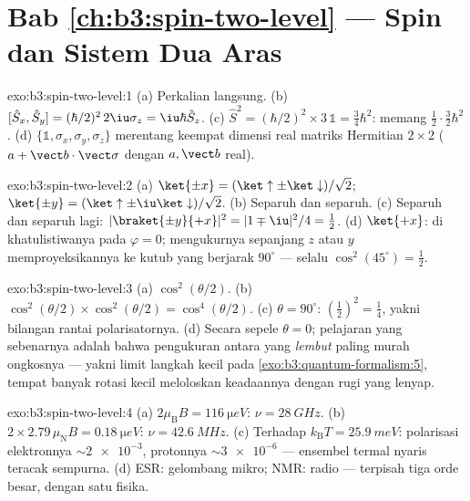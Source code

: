 \section*{Bab \ref{ch:b3:spin-two-level} --- Spin dan Sistem Dua Aras}

\begin{solution}{exo:b3:spin-two-level:1}
(a) Perkalian langsung. (b) $[\hat S_x, \hat S_y] =
(\hbar/2)^2\,2\iu\sigma_z = \iu\hbar\hat S_z$. (c) $\hat S^2 =
(\hbar/2)^2 \times 3\,\mathbb 1 = \tfrac34\hbar^2$: memang
$\tfrac12\cdot\tfrac32\hbar^2$. (d) $\{\mathbb 1, \sigma_x,
\sigma_y, \sigma_z\}$ merentang keempat dimensi real matriks Hermitian
$2\times2$ ($a + \vect b\cdot\vect\sigma$ dengan $a,
\vect b$ real).
\end{solution}

\begin{solution}{exo:b3:spin-two-level:2}
(a) $\ket{\pm x} = (\ket\uparrow \pm \ket\downarrow)/\sqrt2$;
$\ket{\pm y} = (\ket\uparrow \pm \iu\ket\downarrow)/\sqrt2$. (b)
Separuh dan separuh. (c) Separuh dan separuh lagi: $|\braket{\pm y}{+x}|^2 =
|1 \mp \iu|^2/4 = \tfrac12$. (d) $\ket{+x}$: di khatulistiwanya pada
$\varphi =
0$; mengukurnya sepanjang $z$ atau $y$ memproyeksikannya ke
kutub yang berjarak $90^\circ$ --- selalu $\cos^2(45^\circ) = \tfrac12$.
\end{solution}

\begin{solution}{exo:b3:spin-two-level:3}
(a) $\cos^2(\theta/2)$. (b) $\cos^2(\theta/2) \times
\cos^2(\theta/2) = \cos^4(\theta/2)$. (c) $\theta = 90^\circ$:
$(\tfrac12)^2 = \tfrac14$, yakni bilangan rantai polarisatornya. (d)
Secara sepele $\theta = 0$; pelajaran yang sebenarnya adalah bahwa
pengukuran antara yang \emph{lembut} paling murah ongkosnya --- yakni
limit langkah kecil pada \cref{exo:b3:quantum-formalism:5}, tempat
banyak rotasi kecil meloloskan keadaannya dengan rugi yang lenyap.
\end{solution}

\begin{solution}{exo:b3:spin-two-level:4}
(a) $2\mu_{\text{B}}B = \qty{116}{\micro eV}$: $\nu =
\qty{28}{GHz}$. (b) $2 \times 2.79\,\mu_{\text{N}}B =
\qty{0.18}{\micro eV}$: $\nu = \qty{42.6}{MHz}$. (c) Terhadap
$k_{\text{B}}T = \qty{25.9}{meV}$: polarisasi elektronnya
$\sim\num{2e-3}$, protonnya $\sim\num{3e-6}$ --- ensembel  termal
nyaris teracak sempurna. (d) ESR: gelombang mikro;
NMR: radio --- terpisah tiga orde besar, dengan satu fisika.
\end{solution}

